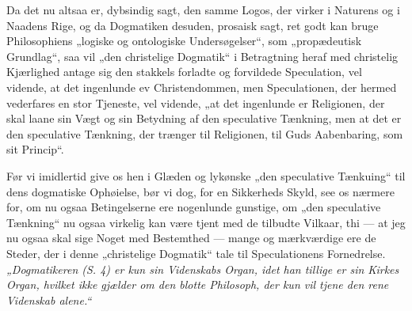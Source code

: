Da det nu altsaa er, dybsindig sagt, den samme Logos, der virker i
Naturens og i Naadens Rige, og da Dogmatiken desuden, prosaisk
sagt, ret godt kan bruge Philosophiens „logiske og ontologiske
Undersøgelser“, som „propædeutisk Grundlag“, saa vil „den
christelige Dogmatik“ i Betragtning heraf med christelig
Kjærlighed antage sig den stakkels forladte og forvildede
Speculation, vel vidende, at det ingenlunde ev
{} Christendommen, men Speculationen, der hermed vederfares en
stor Tjeneste, vel vidende, „at det ingenlunde er Religionen, der
skal laane sin Vægt og sin Betydning af den speculative Tænkning,
men at det er den speculative Tænkning, der trænger til
Religionen, til Guds Aabenbaring, som sit Princip“.

Før vi imidlertid give os hen i Glæden og lykønske „den
speculative Tænkuing“ til dens dogmatiske Ophøielse, bør vi dog,
for en Sikkerheds Skyld, see os nærmere for, om nu ogsaa
Betingelserne ere nogenlunde gunstige, om „den speculative
Tænkning“ nu ogsaa virkelig kan være tjent med de tilbudte
Vilkaar, thi --- at jeg nu ogsaa skal sige Noget med Bestemthed
--- mange og mærkværdige ere de Steder, der i denne „christelige
Dogmatik“ tale til Speculationens Fornedrelse.
 \emph{„Dogmatikeren (S. 4) er kun sin Videnskabs Organ, idet han
tillige er sin Kirkes Organ, hvilket ikke gjælder om den blotte
Philosoph, der kun vil tjene den rene Videnskab alene.“}

